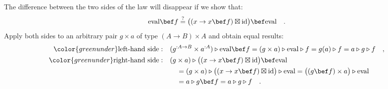 The difference between the two sides of the law will disappear if
we show that:
\[
\text{eval}\bef f\overset{?}{=}\big((x\rightarrow x\bef f)\boxtimes\text{id}\big)\bef\text{eval}\quad.
\]
Apply both sides to an arbitrary pair $g\times a$ of type $\left(A\rightarrow B\right)\times A$
and obtain equal results:
\begin{align*}
{\color{greenunder}\text{left-hand side}:}\quad & (g^{:A\rightarrow B}\times a^{:A})\triangleright\text{eval}\bef f=(g\times a)\triangleright\text{eval}\triangleright f=g(a)\triangleright f=a\triangleright g\triangleright f\quad,\\
{\color{greenunder}\text{right-hand side}:}\quad & (g\times a)\triangleright\big((x\rightarrow x\bef f)\boxtimes\text{id}\big)\bef\text{eval}\\
 & \quad=(g\times a)\triangleright\big((x\rightarrow x\bef f)\boxtimes\text{id}\big)\triangleright\text{eval}=\big((g\bef f)\times a\big)\triangleright\text{eval}\\
 & \quad=a\triangleright g\bef f=a\triangleright g\triangleright f\quad.
\end{align*}

